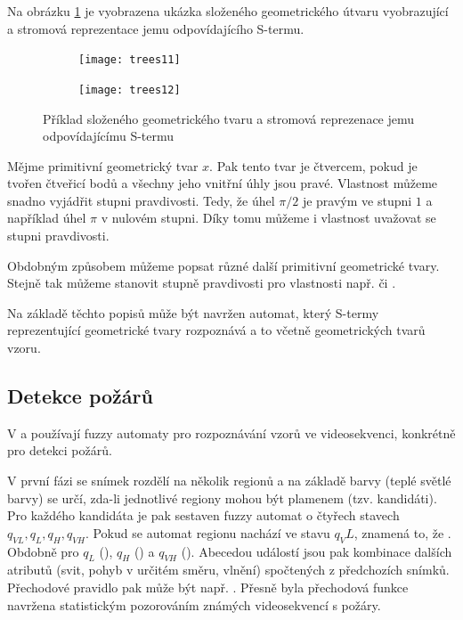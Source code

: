 \documentclass[a4paper,10pt]{article}
\begin{document}
\begin{example}
  Na obrázku \ref{img:Geoms} je vyobrazena ukázka složeného geometrického útvaru vyobrazující  a stromová reprezentace jemu odpovídajícího S-termu.
\end{example}

\begin{figure}
 \centering
 
 \begin{subfigure}{0.4\textwidth}
  \texttt{[image: trees11]}
 \end{subfigure}
 \begin{subfigure}{0.4\textwidth}
  \texttt{[image: trees12]}
 \end{subfigure}
 
 \caption{Příklad složeného geometrického tvaru a stromová reprezenace jemu odpovídajícímu S-termu} \label{img:Geoms}
\end{figure}

Mějme primitivní geometrický tvar $x$. Pak tento tvar je čtvercem, pokud je tvořen čtveřicí bodů a všechny jeho vnitřní úhly jsou pravé. Vlastnost  můžeme snadno vyjádřit stupni pravdivosti. Tedy, že úhel $\pi/2$ je pravým ve stupni $1$ a například úhel $\pi$ v nulovém stupni. Díky tomu můžeme i vlastnost  uvažovat se stupni pravdivosti.

Obdobným způsobem můžeme popsat různé další primitivní geometrické tvary. Stejně tak můžeme stanovit stupně pravdivosti pro vlastnosti např.  či .

Na základě těchto popisů může být navržen automat, který S-termy reprezentující geometrické tvary rozpoznává a to včetně geometrických tvarů  vzoru.

\subsection{Detekce požárů}
V \cite{HamKoNam-FirFlaDetBasFuzFinAut} a \cite{KoHamNam-ModForFuFiAuDetIrrFirFla} používají fuzzy automaty pro rozpoznávání vzorů ve videosekvenci, konkrétně pro detekci požárů.

V první fázi se snímek rozdělí na několik regionů a na základě barvy (teplé světlé barvy) se určí, zda-li jednotlivé regiony mohou být plamenem (tzv. kandidáti). Pro každého kandidáta je pak sestaven fuzzy automat o čtyřech stavech $q_{VL}, q_{L}, q_{H}, q_{VH}$. Pokud se automat regionu nachází ve stavu $q_VL$, znamená to, že . Obdobně pro $q_{L}$ (), $q_{H}$ () a $q_{VH}$ (). Abecedou událostí jsou pak kombinace dalších atributů (svit, pohyb v určitém směru, vlnění) spočtených z předchozích snímků. Přechodové pravidlo pak může být např. . Přesně byla přechodová funkce navržena statistickým pozorováním známých videosekvencí s požáry.
\end{document}

